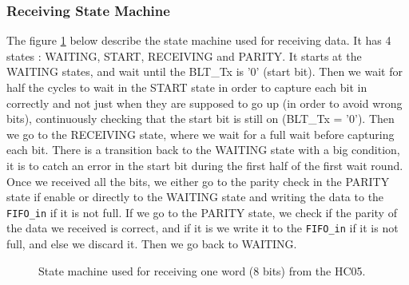 \documentclass[11pt]{article}
\begin{document}
\subsubsection{Receiving State Machine}
The figure \ref{UART_receive_SM} below describe the state machine used for receiving data. It has 4 states : WAITING, START, RECEIVING and PARITY. It starts at the WAITING states, and wait until the BLT\_Tx is '0' (start bit). Then we wait for half the cycles to wait in the START state in order to capture each bit in correctly and not just when they are supposed to go up (in order to avoid wrong bits), continuously checking that the start bit is still on (BLT\_Tx = '0'). Then we go to the RECEIVING state, where we wait for a full wait before capturing each bit. There is a transition back to the WAITING state with a big condition, it is to catch an error in the start bit during the first half of the first wait round. Once we received all the bits, we either go to the parity check in the PARITY state if enable or directly to the WAITING state and writing the data to the \texttt{FIFO\_in} if it is not full. If we go to the PARITY state, we check if the parity of the data we received is correct, and if it is we write it to the \texttt{FIFO\_in} if it is not full, and else we discard it. Then we go back to WAITING.
\begin{figure}[H]
        \caption{State machine used for receiving one word (8 bits) from the HC05.}
        \label{UART_receive_SM}
\end{figure}
\newpage
\end{document}
